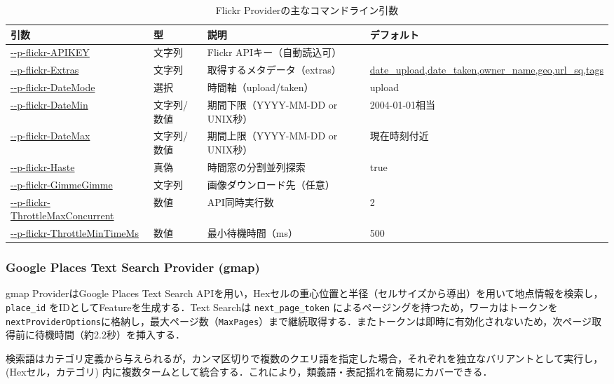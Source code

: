 \documentclass[11pt,a4paper]{jlreq}
\begin{document}
\begin{table}[h]
\centering\small
\setlength{\tabcolsep}{3pt}
\caption{Flickr Providerの主なコマンドライン引数}
\label{tab:flickr_provider_params}
\begin{tabularx}{\textwidth}{L{0.40\textwidth} L{0.09\textwidth} Y L{0.16\textwidth}}
\hline
引数 & 型 & 説明 & デフォルト \\
\hline
\url{--p-flickr-APIKEY} & 文字列 & Flickr APIキー（自動読込可） &  \\
\url{--p-flickr-Extras} & 文字列 & 取得するメタデータ（extras） & \url{date_upload,date_taken,owner_name,geo,url_sq,tags} \\
\url{--p-flickr-DateMode} & 選択 & 時間軸（upload/taken） & upload \\
\url{--p-flickr-DateMin} & 文字列/数値 & 期間下限（YYYY-MM-DD or UNIX秒） & 2004-01-01相当 \\
\url{--p-flickr-DateMax} & 文字列/数値 & 期間上限（YYYY-MM-DD or UNIX秒） & 現在時刻付近 \\
\url{--p-flickr-Haste} & 真偽 & 時間窓の分割並列探索 & true \\
\url{--p-flickr-GimmeGimme} & 文字列 & 画像ダウンロード先（任意） &  \\
\url{--p-flickr-ThrottleMaxConcurrent} & 数値 & API同時実行数 & 2 \\
\url{--p-flickr-ThrottleMinTimeMs} & 数値 & 最小待機時間（ms） & 500 \\
\hline
\end{tabularx}
\end{table}

\subsubsection{Google Places Text Search Provider (gmap)}
gmap ProviderはGoogle Places Text Search APIを用い，Hexセルの重心位置と半径（セルサイズから導出）を用いて地点情報を検索し，\texttt{place\_id} をIDとしてFeatureを生成する．Text Searchは \texttt{next\_page\_token} によるページングを持つため，ワーカはトークンを\texttt{nextProviderOptions}に格納し，最大ページ数（\texttt{MaxPages}）まで継続取得する．またトークンは即時に有効化されないため，次ページ取得前に待機時間（約2.2秒）を挿入する．

検索語はカテゴリ定義から与えられるが，カンマ区切りで複数のクエリ語を指定した場合，それぞれを独立なバリアントとして実行し，(Hexセル，カテゴリ) 内に複数タームとして統合する．これにより，類義語・表記揺れを簡易にカバーできる．
\end{document}
